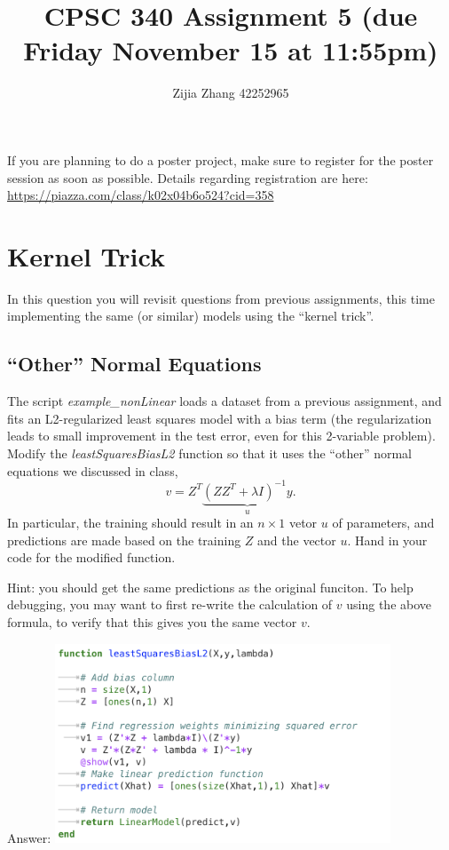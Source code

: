 \documentclass{article}
\def\ans#1{\par\gre{Answer: #1}}
\def\blu#1{{\color{blu}#1}}
\def\gre#1{{\color{gre}#1}}
\def\red#1{{\color{red}#1}}
\begin{document}
\title{CPSC 340 Assignment 5 (due Friday November 15 at 11:55pm)}
\author{Zijia Zhang 42252965}
\date{}
\maketitle
\vspace{-2em}


\red{If you are planning to do a poster project, make sure to register for the poster session as soon as possible. Details regarding registration are here:\\
\url{https://piazza.com/class/k02x04b6o524?cid=358}
}


\section{Kernel Trick}

In this question you will revisit questions from previous assignments, this time implementing the same (or similar) models using the ``kernel trick''.

\subsection{``Other'' Normal Equations}

The script \emph{example\_nonLinear} loads a dataset from a previous assignment, and fits an L2-regularized least squares model with a bias term (the regularization leads to small improvement in the test error, even for this 2-variable problem). Modify the \emph{leastSquaresBiasL2} function so that it uses the ``other'' normal equations we discussed in class,
\[
v = Z^T\underbrace{(ZZ^T + \lambda I)^{-1}y}_u.
\]
In particular, the training should result in an $n \times 1$ vetor $u$ of parameters, and predictions are made based on the training $Z$ and the vector $u$. \blu{Hand in your code for the modified function}.

Hint: you should get the same predictions as the original funciton. To help debugging, you may want to first re-write the calculation of $v$ using the above formula, to verify that this gives you the same vector $v$.
\ans{\includegraphics[width=10cm]{Q11.png}}
\end{document}
